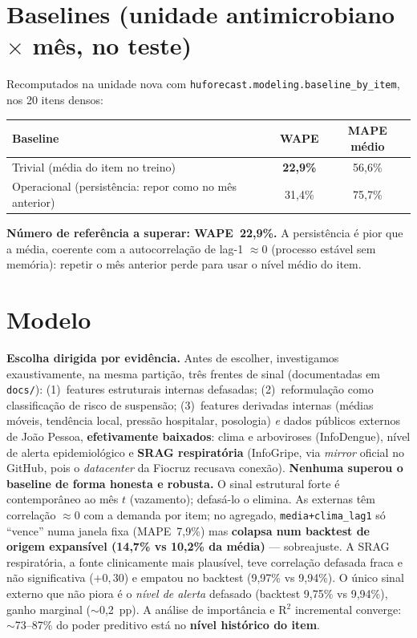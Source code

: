 \documentclass[11pt,a4paper]{article}
\begin{document}
\section{Baselines (unidade antimicrobiano $\times$ mês, no teste)}
Recomputados na unidade nova com \texttt{huforecast.modeling.baseline\_by\_item}, nos 20 itens densos:

\begin{center}
\begin{tabular}{@{}lcc@{}}
\toprule
\textbf{Baseline} & \textbf{WAPE} & \textbf{MAPE médio} \\
\midrule
Trivial (média do item no treino) & \textbf{22,9\%} & 56,6\% \\
Operacional (persistência: repor como no mês anterior) & 31,4\% & 75,7\% \\
\bottomrule
\end{tabular}
\end{center}

\noindent\textbf{Número de referência a superar: WAPE~22,9\%.} A persistência é pior que a média, coerente com a autocorrelação de lag-1 $\approx$0 (processo estável sem memória): repetir o mês anterior perde para usar o nível médio do item.

\section{Modelo}
\textbf{Escolha dirigida por evidência.} Antes de escolher, investigamos exaustivamente, na mesma partição, três frentes de sinal (documentadas em \texttt{docs/}): (1)~features estruturais internas defasadas; (2)~reformulação como classificação de risco de suspensão; (3)~features derivadas internas (médias móveis, tendência local, pressão hospitalar, posologia) \emph{e} dados públicos externos de João Pessoa, \textbf{efetivamente baixados}: clima e arboviroses (InfoDengue), nível de alerta epidemiológico e \textbf{SRAG respiratória} (InfoGripe, via \emph{mirror} oficial no GitHub, pois o \emph{datacenter} da Fiocruz recusava conexão). \textbf{Nenhuma superou o baseline de forma honesta e robusta.} O sinal estrutural forte é contemporâneo ao mês $t$ (vazamento); defasá-lo o elimina. As externas têm correlação $\approx$0 com a demanda por item; no agregado, \texttt{media+clima\_lag1} só ``vence'' numa janela fixa (MAPE~7,9\%) mas \textbf{colapsa num backtest de origem expansível (14,7\% vs 10,2\% da média)} --- sobreajuste. A SRAG respiratória, a fonte clinicamente mais plausível, teve correlação defasada fraca e não significativa ($+0{,}30$) e empatou no backtest (9,97\% vs 9,94\%). O único sinal externo que não piora é o \emph{nível de alerta} defasado (backtest 9,75\% vs 9,94\%), ganho marginal ($\sim$0,2~pp). A análise de importância e R$^2$ incremental converge: $\sim$73--87\% do poder preditivo está no \textbf{nível histórico do item}.
\end{document}
